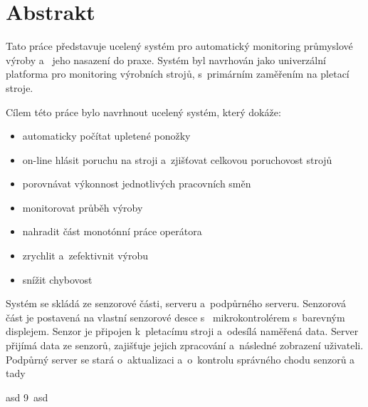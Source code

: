 \documentclass[12pt, a4paper]{article}
\begin{document}



\newpage

\section*{Abstrakt}
Tato práce představuje ucelený systém pro automatický monitoring průmyslové výroby a~
    jeho nasazení do praxe.
Systém byl navrhován jako univerzální platforma pro monitoring výrobních strojů, s~primárním zaměřením na pletací stroje.

Cílem této práce bylo navrhnout ucelený systém, který dokáže:

\begin{itemize}
    \item automaticky počítat upletené ponožky
    \item on-line hlásit poruchu na stroji a~zjišťovat celkovou poruchovost strojů
    \item porovnávat výkonnost jednotlivých pracovních směn
    \item monitorovat průběh výroby
    \item nahradit část monotónní práce operátora
    \item zrychlit a~zefektivnit výrobu
    \item snížit chybovost
\end{itemize}

Systém se skládá ze senzorové části, serveru a~podpůrného serveru.
Senzorová část je postavená na vlastní senzorové desce s~
mikrokontrolérem s~barevným displejem. Senzor je připojen k~pletacímu stroji a~odesílá naměřená data.
Server přijímá  data ze senzorů, zajišťuje jejich zpracování a~následné zobrazení uživateli.
Podpůrný server se stará o~aktualizaci a~o~kontrolu správného chodu senzorů a~
tady

asd 9~asd
\end{document}
